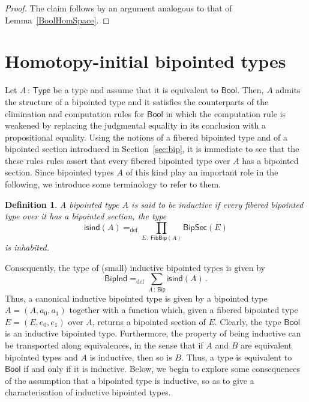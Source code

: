 \documentclass[10pt,a4paper,oneside,reqno]{amsart}
\theoremstyle{mythm}
\theoremstyle{mydef}
\newtheorem{definition}[theorem]{Definition}
\theoremstyle{myrmk}
\newcommand{\ie}{\text{i.e.\ }}
\newcommand{\defeq}{=_{\mathrm{def}}}
\newcommand{\co}{\,{:}\,}
\newcommand{\isbipind}{\mathsf{isind}}
\newcommand{\Bool}{\mathsf{Bool}}
\newcommand{\U}{\mathsf{Type}}
\newcommand{\Bip}{\mathsf{Bip}}
\newcommand{\FibBip}{\mathsf{FibBip}}
\newcommand{\BipSec}{\mathsf{BipSec}}
\begin{document}
\begin{proof} The claim follows by an argument analogous to that of Lemma~\ref{BoolHomSpace}.
\end{proof}







\section{Homotopy-initial bipointed types} 
\label{sec:homibt}


Let $A \co \U$ be a  type and assume that it is equivalent to $\Bool$. Then, $A$ admits the structure of a bipointed type and
it satisfies the counterparts of the elimination and computation rules for $\Bool$ in which the computation rule is 
weakened by replacing the judgmental equality in its conclusion with a propositional equality. Using the notions of a fibered bipointed type and of a bipointed section introduced in Section~\ref{sec:bip}, it is immediate to see that the these rules rules assert that every fibered bipointed type over $A$ has a bipointed section. Since bipointed types $A$ of this kind  play an important role in the following, we introduce some terminology to refer to them.


 



\begin{definition} A bipointed type $A$ is said to be \emph{inductive} if every fibered bipointed type over it has a bipointed section, \ie the type
\[ 
\isbipind(A) \defeq \prod_{E \co \FibBip(A)}  \BipSec(E)
\]  
is inhabited. \end{definition} 

Consequently, the type of (small) inductive bipointed types is given by
\[
\mathsf{BipInd} \defeq \sum_{A \co \Bip} \isbipind(A) \, .
\]
Thus, a canonical inductive bipointed type is given by a bipointed type $A = (A, a_0, a_1)$ together with a function 
which, given a fibered bipointed type $E = (E, e_0, e_1)$ over $A$, returns a bipointed section of $E$.
Clearly, the type $\Bool$ is an inductive bipointed type. Furthermore, the property of being inductive can be transported along equivalences, in the sense that if $A$ and $B$ are equivalent bipointed types and $A$ is inductive, then so is $B$. Thus, a
type is equivalent to $\Bool$ if and only if it is inductive. Below,
we begin to explore some consequences of the assumption that a bipointed type is inductive, so as to give a 
characterisation of inductive bipointed types.
\end{document}
